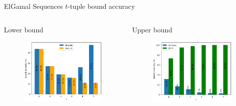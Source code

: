 \begin{frame}{ElGamal Sequences $t$-tuple bound accuracy}
    \begin{columns}
        \begin{column}{0.45\textwidth}
        \begin{center}
            Lower bound
        \end{center}
            \begin{figure}
                \centering
                \includegraphics[width=\textwidth]{figures/TuplesLowerBoundAccuracy.png}
            \end{figure}
        \end{column}
        \begin{column}{0.45\textwidth}
        \begin{center}
            Upper bound 
        \end{center}
            \begin{figure}
                \centering
                \includegraphics[width=\textwidth]{figures/TuplesUpperBoundAccuracy.png}

\end{figure}
\end{column}
\end{columns}
\end{frame}
